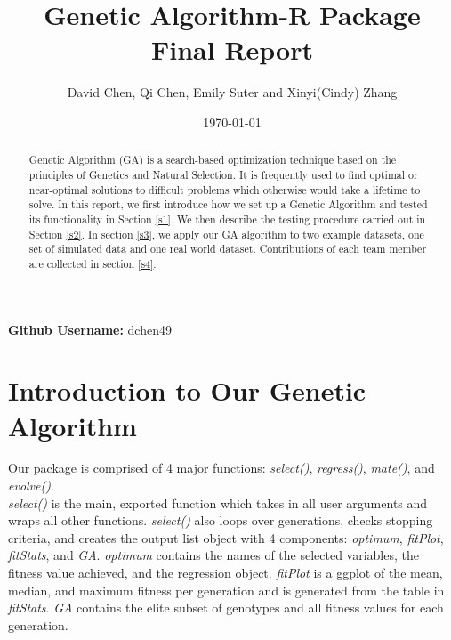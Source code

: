 \documentclass{article}
\begin{document}


\graphicspath{ {GA/} }

\title{\LARGE Genetic Algorithm-R Package Final Report}
\author{David Chen, Qi Chen, Emily Suter and Xinyi(Cindy) Zhang}


\date{\today}

\maketitle

\begin{abstract}
Genetic Algorithm (GA) is a search-based optimization technique based on the principles of Genetics and Natural Selection. It is frequently used to find optimal or near-optimal solutions to difficult problems which otherwise would take a lifetime to solve. In this report, we first introduce how we set up a Genetic Algorithm and tested its functionality in Section \ref{s1}. We then describe the testing procedure carried out in Section \ref{s2}. In section \ref{s3}, we apply our GA algorithm to two example datasets, one set of simulated data and one real world dataset. Contributions of each team member are collected in section \ref{s4}.
\end{abstract}

\begin{center}
\textbf{Github Username:} dchen49
\end{center}

\newpage
\pagestyle{empty}

\section{Introduction to Our Genetic Algorithm}\label{s1}

Our package is comprised of 4 major functions: \textit{select()}, \textit{regress()}, \textit{mate()}, and \textit{evolve()}.\\

\textit{select()} is the main, exported function which takes in all user arguments and wraps all other functions. \textit{select()} also loops over generations, checks stopping criteria, and creates the output list object with 4 components: \textit{optimum}, \textit{fitPlot}, \textit{fitStats}, and \textit{GA}. \textit{optimum} contains the names of the selected variables, the fitness value achieved, and the regression object. \textit{fitPlot} is a ggplot of the mean, median, and maximum fitness per generation and is generated from the table in \textit{fitStats}. \textit{GA} contains the elite subset of genotypes and all fitness values for each generation.\\
\end{document}
